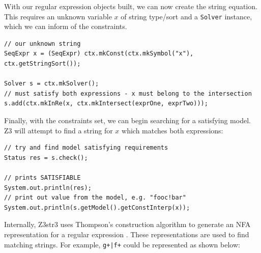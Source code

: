 \documentclass[a4paper]{article}
\begin{document}
With our regular expression objects built, we can now create the string equation. This requires an unknown variable $x$ of string type/sort and a \texttt{Solver} instance, which we can inform of the constraints.

\begin{verbatim}
// our unknown string
SeqExpr x = (SeqExpr) ctx.mkConst(ctx.mkSymbol("x"), ctx.getStringSort());

Solver s = ctx.mkSolver();
// must satisfy both expressions - x must belong to the intersection
s.add(ctx.mkInRe(x, ctx.mkIntersect(exprOne, exprTwo)));
\end{verbatim}
Finally, with the constraints set, we can begin searching for a satisfying model. Z3 will attempt to find a string for $x$ which matches both expressions:

\begin{verbatim}
// try and find model satisfying requirements
Status res = s.check();

// prints SATISFIABLE
System.out.println(res);
// print out value from the model, e.g. "fooc!bar"
System.out.println(s.getModel().getConstInterp(x));
\end{verbatim}



Internally, Z3str3 uses Thompson's construction algorithm to generate an NFA representation for a regular expression \citep{z3nfa}. These representations are used to find matching strings. For example, \texttt{g+|f+} could be represented as shown below:

\begin{center}
\end{center}
\end{document}
